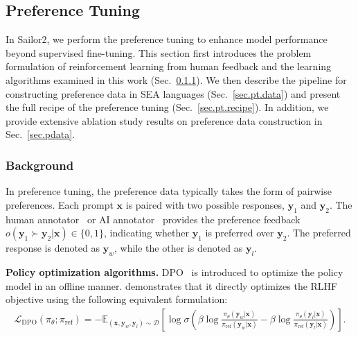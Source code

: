

\subsection{Preference Tuning}

In Sailor2, we perform the preference tuning to enhance model performance beyond supervised fine-tuning. This section first introduces the problem formulation of reinforcement learning from human feedback and the learning algorithms examined in this work (Sec.~\ref{sec.pt.background}). We then describe the pipeline for constructing preference data in SEA languages (Sec.~\ref{sec.pt.data}) and present the full recipe of the preference tuning (Sec.~\ref{sec.pt.recipe}). In addition, we provide extensive ablation study results on preference data construction in Sec.~\ref{sec.pdata}.

\subsubsection{Background}\label{sec.pt.background}
In preference tuning, the preference data typically takes the form of pairwise preferences. Each prompt $\mathbf{x}$ is paired with two possible responses, $\mathbf{y}_1$ and $\mathbf{y}_2$. The human annotator~\citep{christiano2017deep} or AI annotator~\citep{lee2023rlaif} provides the preference feedback $o(\mathbf{y}_1 \succ \mathbf{y}_2|\mathbf{x}) \in \{0,1\}$, indicating whether $\mathbf{y}_1$ is preferred over $\mathbf{y}_2$. The preferred response is denoted as $\mathbf{y}_w$, while the other is denoted as $\mathbf{y}_l$. 

\textbf{Policy optimization algorithms.} DPO~\citep{rafailov2024direct} is introduced to optimize the policy model in an offline manner. \cite{rafailov2024direct} demonstrates that it directly optimizes the RLHF objective using the following equivalent formulation:
\begin{align}
    \mathcal{L}_{\text{DPO}}(\pi_\theta; \pi_{\text{ref}}) = -\mathbb{E}_{(\mathbf{x}, \mathbf{y}_w, \mathbf{y}_l) \sim \mathcal{D}} \left[ \log \sigma \left( \beta \log \frac{\pi_\theta(\mathbf{y}_w|\mathbf{x})}{\pi_{\text{ref}}(\mathbf{y}_w|\mathbf{x})} - \beta \log \frac{\pi_\theta(\mathbf{y}_l|\mathbf{x})}{\pi_{\text{ref}}(\mathbf{y}_l|\mathbf{x})} \right) \right].
\end{align}

